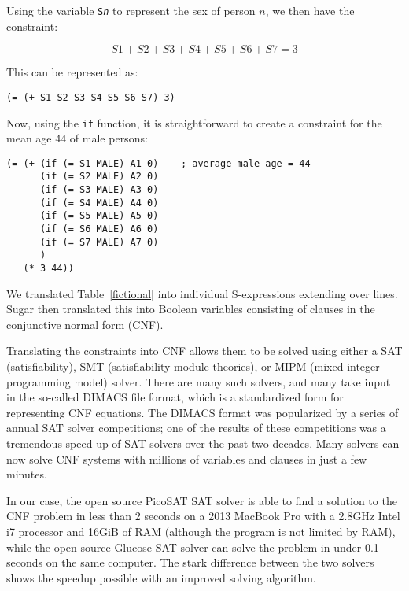\documentclass[runningheads]{llncs}
\begin{document}
Using the variable \texttt{S\emph{n}} to represent the sex of person
$n$, we then have the constraint:

\begin{equation}
S1 + S2 + S3 + S4 + S5 + S6 + S7 = 3
\end{equation}

This can be represented as:

\begin{Verbatim}
(= (+ S1 S2 S3 S4 S5 S6 S7) 3)
\end{Verbatim}

Now, using the \texttt{if} function, it is straightforward to create a constraint for
the mean age 44 of male persons:

\begin{Verbatim}
(= (+ (if (= S1 MALE) A1 0)    ; average male age = 44
      (if (= S2 MALE) A2 0)
      (if (= S3 MALE) A3 0)
      (if (= S4 MALE) A4 0)
      (if (= S5 MALE) A5 0)
      (if (= S6 MALE) A6 0)
      (if (= S7 MALE) A7 0)
      )
   (* 3 44))
\end{Verbatim}

We translated Table~\ref{fictional} into \NumSExpressions{} individual
S-expressions extending over \NumConstraintLines{} lines. Sugar then
translated this into \NumVariables Boolean variables consisting of
\NumClauses clauses in the conjunctive normal form (CNF). 

Translating the constraints into CNF allows them to be solved using
either a SAT (satisfiability), SMT (satisfiability module theories),
or MIPM (mixed integer programming model) solver. There are many such
solvers, and many take input in the so-called DIMACS file
format, which is a standardized form for representing CNF equations. 
The DIMACS format was popularized by a series of annual SAT solver
competitions; one of the results of these competitions was a
tremendous speed-up of SAT solvers over the past two decades. Many
solvers can now solve CNF systems with millions of variables and
clauses in just a few minutes.

In our case, the open source
PicoSAT\cite{Biere_picosatessentials} SAT solver is able to find a
solution to the CNF problem in less than 2 seconds on a 2013 MacBook
Pro with a 2.8GHz Intel i7 processor and 16GiB of RAM (although the
program is not limited by RAM), while the open source Glucose SAT solver
can solve the problem in under 0.1 seconds on the same computer. The
stark difference between the two solvers shows the speedup possible
with an improved solving algorithm. 
\end{document}
